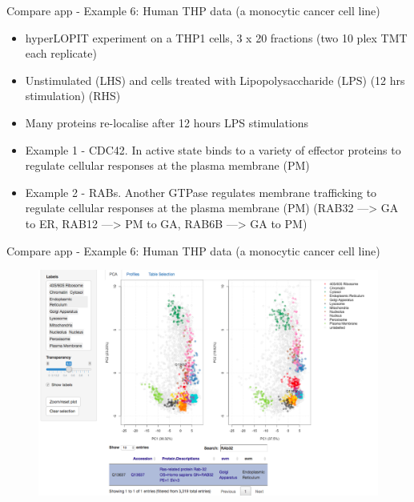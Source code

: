 \documentclass[bigger]{beamer}
\begin{document}
\begin{frame}{Compare app - Example 6: Human THP data (a monocytic cancer cell line)}
\smallskip
\footnotesize {
  \begin{itemize} 
  \item hyperLOPIT experiment on a THP1 cells, 3 x 20 fractions (two 10 plex TMT each replicate) 
  \item Unstimulated (LHS) and cells treated with Lipopolysaccharide (LPS) (12 hrs stimulation) (RHS)
  \item Many proteins re-localise after 12 hours LPS stimulations
  \item Example 1 - CDC42. In active state binds to a variety of effector proteins to regulate cellular responses at the plasma membrane (PM)
  \item Example 2 - RABs. Another GTPase regulates membrane trafficking to regulate cellular responses at the plasma membrane (PM) (RAB32 --->  GA to ER, RAB12 --->  PM to GA, RAB6B --->  GA to PM)
    \end{itemize}
  }
\end{frame}


\begin{frame}{Compare app - Example 6: Human THP data (a monocytic cancer cell line)}
  \begin{figure}
      \includegraphics[width=1\linewidth]{Figures/demo6b-rab32-pca.png}
  \end{figure}
\end{frame}
\end{document}
